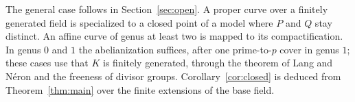 The general case follows in Section~\ref{sec:open}. A proper curve over a finitely generated field is specialized to a closed point of a model where $P$ and $Q$ stay distinct. An affine curve of genus at least two is mapped to its compactification. In genus $0$ and $1$ the abelianization suffices, after one prime-to-$p$ cover in genus $1$; these cases use that $K$ is finitely generated, through the theorem of Lang and N\'eron and the freeness of divisor groups. Corollary~\ref{cor:closed} is deduced from Theorem~\ref{thm:main} over the finite extensions of the base field.

